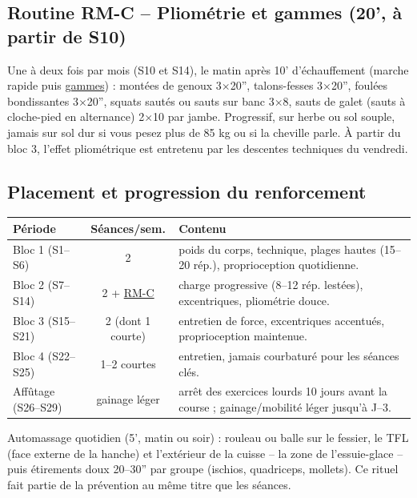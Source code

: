 \documentclass[10pt,a4paper]{article}
\newcommand{\rmc}{\hyperlink{rm-c}{RM-C}}
\newcommand{\gam}{\hyperlink{gammes}{gammes}}
\begin{document}
\subsection{Routine RM-C -- Pliom\'etrie et gammes (20', \`a partir de S10)}
\hypertarget{rm-c}{}
Une \`a deux fois par mois (S10 et S14), le matin apr\`es 10' d'\'echauffement
(marche rapide puis \gam{}) :
mont\'ees de genoux 3$\times$20'', talons-fesses 3$\times$20'', foul\'ees
bondissantes 3$\times$20'', squats saut\'es ou sauts sur banc 3$\times$8,
sauts de galet (sauts \`a cloche-pied en alternance) 2$\times$10 par jambe.
Progressif, sur herbe ou sol souple, jamais sur sol dur si vous pesez plus de
85 kg ou si la cheville parle. \`A partir du bloc 3, l'effet pliom\'etrique est
entretenu par les descentes techniques du vendredi.

\subsection{Placement et progression du renforcement}
\begin{center}
\begin{tabularx}{\textwidth}{@{}l>{\small}cX@{}}
\toprule
\textbf{P\'eriode} & \textbf{S\'eances/sem.} & \textbf{Contenu}\\
\midrule
Bloc 1 (S1--S6) & 2 & poids du corps, technique, plages hautes (15--20 r\'ep.), proprioception quotidienne.\\
Bloc 2 (S7--S14) & 2 + \rmc{} & charge progressive (8--12 r\'ep. lest\'ees), excentriques, pliom\'etrie douce.\\
Bloc 3 (S15--S21) & 2 (dont 1 courte) & entretien de force, excentriques accentu\'es, proprioception maintenue.\\
Bloc 4 (S22--S25) & 1--2 courtes & entretien, jamais courbatur\'e pour les s\'eances cl\'es.\\
Aff\^utage (S26--S29) & gainage l\'eger & arr\^et des exercices lourds 10 jours avant la course ; gainage/mobilit\'e l\'eger jusqu'\`a J--3.\\
\bottomrule
\end{tabularx}
\end{center}

\begin{aret}
Automassage quotidien (5', matin ou soir) : rouleau ou balle sur le
fessier, le TFL (face externe de la hanche) et l'ext\'erieur de la cuisse
-- la zone de l'essuie-glace -- puis \'etirements doux 20--30'' par groupe
(ischios, quadriceps, mollets). Ce rituel fait partie de la
pr\'evention au m\^eme titre que les s\'eances.
\end{aret}
\end{document}
